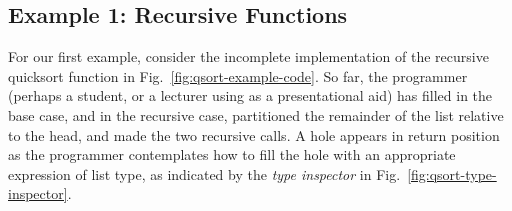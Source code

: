 
\subsection{Example 1: Recursive Functions}\label{sec:qsort1}\label{sec:paths}



For our first example, consider the incomplete implementation of the recursive quicksort function in Fig.~\ref{fig:qsort-example-code}. So far, the programmer (perhaps a student, or a lecturer using \Hazel as a presentational aid) has filled in the base case, and in the recursive case, partitioned the remainder of the list relative to the head, and made the two recursive calls. A hole appears in return position as the programmer contemplates how to fill the hole with an appropriate expression of list type, as indicated by the \emph{type inspector} in Fig.~\ref{fig:qsort-type-inspector}.

